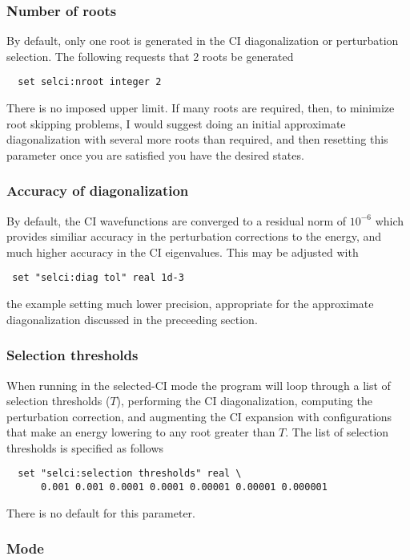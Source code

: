 \subsubsection{Number of roots}

By default, only one root is generated in the CI diagonalization or
perturbation selection.  The following requests that 2 roots be
generated
\begin{verbatim}
  set selci:nroot integer 2
\end{verbatim}
There is no imposed upper limit.  If many roots are required, then, to
minimize root skipping problems, I would suggest doing an initial
approximate diagonalization with several more roots than required,
and then resetting this parameter once you are satisfied you have the
desired states.

\subsubsection{Accuracy of diagonalization}

By default, the CI wavefunctions are converged to a residual norm of
$10^{-6}$ which provides similiar accuracy in the perturbation
corrections to the energy, and much higher accuracy in the CI
eigenvalues.  This may be adjusted with
\begin{verbatim}
 set "selci:diag tol" real 1d-3
\end{verbatim}
the example setting much lower precision, appropriate for the
approximate diagonalization discussed in the preceeding section.

\subsubsection{Selection thresholds}

When running in the selected-CI mode the program will loop
through a list of selection thresholds ($T$), performing the CI
diagonalization, computing the perturbation correction, and augmenting
the CI expansion with configurations that make an energy lowering to
any root greater than $T$.  The list of selection thresholds is
specified as follows
\begin{verbatim}
  set "selci:selection thresholds" real \
      0.001 0.001 0.0001 0.0001 0.00001 0.00001 0.000001
\end{verbatim}

There is no default for this parameter.


\subsubsection{Mode}

